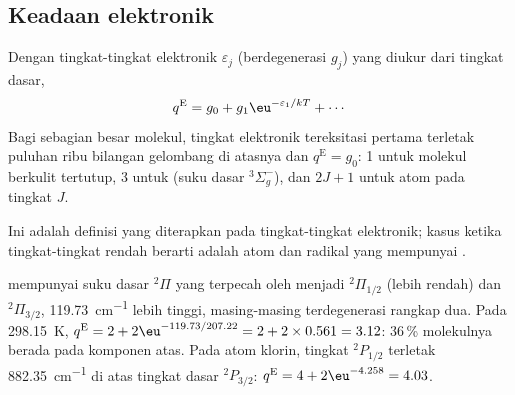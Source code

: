 \subsection*{Keadaan elektronik}

\begin{proposition}\label{prop:b3:partition-functions:q-elec}
Dengan tingkat-tingkat elektronik $\varepsilon_j$ (berdegenerasi $g_j$) yang
diukur dari tingkat dasar,
\[
  q^{\mathrm E} = g_0 + g_1\eu^{-\varepsilon_1/kT} + \cdots
\]
Bagi sebagian besar molekul, tingkat elektronik tereksitasi pertama terletak
puluhan ribu bilangan gelombang di atasnya dan $q^{\mathrm E} = g_0$: 1 untuk
molekul berkulit tertutup, 3 untuk  (suku dasar ${}^3\Sigma_g^-$), dan
$2J + 1$ untuk atom pada tingkat $J$.
\end{proposition}

Ini adalah definisi yang diterapkan pada tingkat-tingkat elektronik; kasus
ketika tingkat-tingkat rendah berarti adalah atom dan radikal yang mempunyai
.

\begin{example}\label{ex:b3:partition-functions:no-cl}
 mempunyai suku dasar ${}^2\Pi$ yang terpecah oleh 
menjadi ${}^2\Pi_{1/2}$ (lebih rendah) dan ${}^2\Pi_{3/2}$, \qty{119.73}{cm^{-1}}
lebih tinggi, masing-masing terdegenerasi rangkap dua. Pada \qty{298.15}{K},
$q^{\mathrm E} = 2 + 2\eu^{-119.73/207.22} = 2 + 2\times0.561 = 3.12$: 36\,\% molekulnya
berada pada komponen atas. Pada atom klorin, tingkat ${}^2P_{1/2}$ terletak
\qty{882.35}{cm^{-1}} di atas tingkat dasar ${}^2P_{3/2}$:
$q^{\mathrm E} = 4 + 2\eu^{-4.258} = 4.03$.
\end{example}


